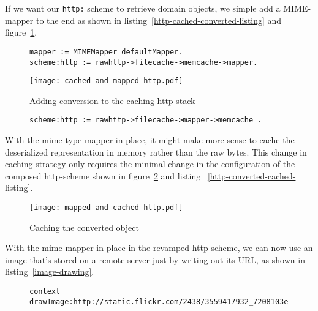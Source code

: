 \documentclass[preprint,authoryear]{llncs}
\begin{document}
If we want our {\tt http:} scheme to retrieve domain objects, we simple add a MIME-mapper
to the end as shown in listing~\ref{http-cached-converted-listing} and figure~\ref{http-cached-converted}.


\begin{figure}[htbp]
\begin{lstlisting}[style=L,label=http-cached-converted-listing,caption=Caching and converting.]
mapper := MIMEMapper defaultMapper.
scheme:http := rawhttp->filecache->memcache->mapper.
\end{lstlisting}
\end{figure}


\begin{figure}[htbp]
\begin{center}
\texttt{[image: cached-and-mapped-http.pdf]}
\caption{Adding conversion to the caching http-stack}
\label{http-cached-converted}
\end{center}
\end{figure}


\begin{figure}[htbp]
\begin{lstlisting}[style=L,label=http-converted-cached-listing,caption=Converting and caching.]
scheme:http := rawhttp->filecache->mapper->memcache .
\end{lstlisting}
\end{figure}


With the mime-type mapper in place, it might make more sense to
cache the deserialized representation in memory rather than
the raw bytes.  This change in caching strategy only requires
the minimal change in the configuration of the composed http-scheme
shown in figure~\ref{http-converted-cached} and listing ~\ref{http-converted-cached-listing}.

\begin{figure}[htbp]
\begin{center}
\texttt{[image: mapped-and-cached-http.pdf]}
\caption{Caching the converted object}
\label{http-converted-cached}
\end{center}
\end{figure}


With the mime-mapper in place in the revamped http-scheme, we can now use 
an image that's stored on a remote server just by writing out its URL, as shown
in listing~\ref{image-drawing}.

\begin{figure}[htbp]
\begin{lstlisting}[style=L,label=image-drawing,caption=Drawing a remote image via {\tt http:}.]
context drawImage:http://static.flickr.com/2438/3559417932_7208103ed8_m.jpg
\end{lstlisting}
\end{figure}
\end{document}
